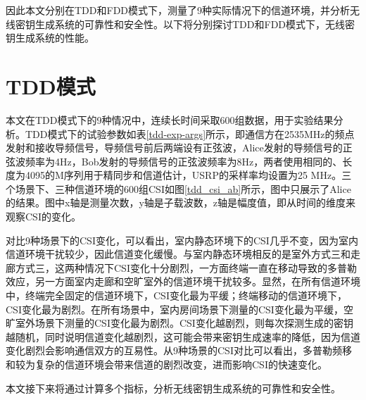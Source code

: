 \documentclass[master]{seuthesis} %
\begin{document}
\begin{Main}
因此本文分别在TDD和FDD模式下，测量了9种实际情况下的信道环境，并分析无线密钥生成系统的可靠性和安全性。以下将分别探讨TDD和FDD模式下，无线密钥生成系统的性能。


  
\section{TDD模式}


本文在TDD模式下的9种情况中，连续长时间采取600组数据，用于实验结果分析。TDD模式下的试验参数如表\ref{tdd-exp-args}所示，即通信方在2535MHz的频点发射和接收导频信号，导频信号前后两端设有正弦波，Alice发射的导频信号的正弦波频率为4Hz，Bob发射的导频信号的正弦波频率为8Hz，两者使用相同的、长度为4095的M序列用于精同步和信道估计，USRP的采样率均设置为25 MHz。三个场景下、三种信道环境的600组CSI如图\ref{tdd_csi_ab}所示，图中只展示了Alice的结果。图中x轴是测量次数，y轴是子载波数，z轴是幅度值，即从时间的维度来观察CSI的变化。

对比9种场景下的CSI变化，可以看出，室内静态环境下的CSI几乎不变，因为室内信道环境干扰较少，因此信道变化缓慢。与室内静态环境相反的是室外方式三和走廊方式三，这两种情况下CSI变化十分剧烈，一方面终端一直在移动导致的多普勒效应，另一方面室内走廊和空旷室外的信道环境干扰较多。显然，在所有信道环境中，终端完全固定的信道环境下，CSI变化最为平缓；终端移动的信道环境下，CSI变化最为剧烈。在所有场景中，室内房间场景下测量的CSI变化最为平缓，空旷室外场景下测量的CSI变化最为剧烈。CSI变化越剧烈，则每次探测生成的密钥越随机，同时说明信道变化越剧烈，这可能会带来密钥生成速率的降低，因为信道变化剧烈会影响通信双方的互易性。从9种场景的CSI对比可以看出，多普勒频移和较为复杂的信道环境会带来信道的剧烈改变，进而影响CSI的快速变化。

本文接下来将通过计算多个指标，分析无线密钥生成系统的可靠性和安全性。


\end{Main}
\end{document}
